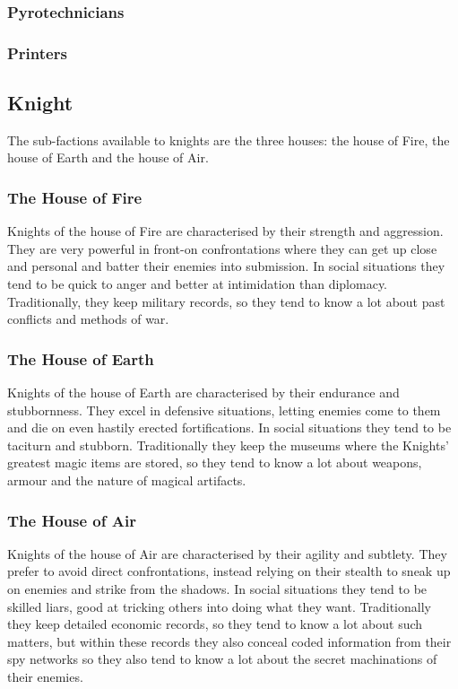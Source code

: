 \documentclass{report}
\begin{document}
\subsubsection{Pyrotechnicians}

\subsubsection{Printers}


\subsection{Knight}
The sub-factions available to knights are the three houses: the house of Fire, the house of Earth and the house of Air.

\subsubsection{The House of Fire}
Knights of the house of Fire are characterised by their strength and aggression. They are very powerful in front-on
confrontations where they can get up close and personal and batter their enemies into submission. In social situations they
tend to be quick to anger and better at intimidation than diplomacy. Traditionally, they keep military records, so they
tend to know a lot about past conflicts and methods of war.

\subsubsection{The House of Earth}
Knights of the house of Earth are characterised by their endurance and stubbornness. They excel in defensive situations,
letting enemies come to them and die on even hastily erected fortifications. In social situations they tend to be taciturn
and stubborn. Traditionally they keep the museums where the Knights' greatest magic items are stored, so they tend to know
a lot about weapons, armour and the nature of magical artifacts.

\subsubsection{The House of Air}
Knights of the house of Air are characterised by their agility and subtlety. They prefer to avoid direct confrontations,
instead relying on their stealth to sneak up on enemies and strike from the shadows. In social situations they tend to be
skilled liars, good at tricking others into doing what they want. Traditionally they keep detailed economic records, so
they tend to know a lot about such matters, but within these records they also conceal coded information from their spy
networks so they also tend to know a lot about the secret machinations of their enemies.
\end{document}
